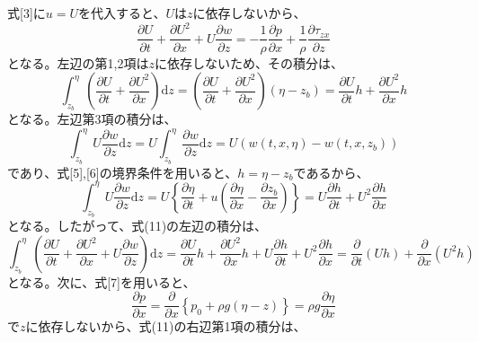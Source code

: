 \documentclass[a4paper]{jsarticle}
\begin{document}
\subsection{}
式[3]に$u = U$を代入すると、$U$は$z$に依存しないから、
\begin{equation}
  \frac{\partial U}{\partial t} + \frac{\partial U^2}{\partial x}
  + U \frac{\partial w}{\partial z} = -\frac{1}{\rho} \frac{\partial p}{\partial x}
  + \frac{1}{\rho} \frac{\partial \tau_{zx}}{\partial z}
\end{equation}
となる。左辺の第1,2項は$z$に依存しないため、その積分は、
\begin{equation}
  \int_{z_b}^{\eta} \left(\frac{\partial U}{\partial t} + \frac{\partial U^2}{\partial x}\right) \mathrm{d} z
  = \left(\frac{\partial U}{\partial t} + \frac{\partial U^2}{\partial x}\right) (\eta - z_b)
  = \frac{\partial U}{\partial t} h + \frac{\partial U^2}{\partial x} h
\end{equation}
となる。左辺第3項の積分は、
\begin{equation}
  \int_{z_b}^{\eta} U \frac{\partial w}{\partial z} \mathrm{d} z
  = U \int_{z_b}^{\eta} \frac{\partial w}{\partial z} \mathrm{d} z
  = U \left(w(t, x, \eta) - w(t, x, z_b)\right)
\end{equation}
であり、式[5],[6]の境界条件を用いると、$h = \eta - z_b$であるから、
\begin{equation}
  \int_{z_b}^{\eta} U \frac{\partial w}{\partial z} \mathrm{d} z
  = U \left\{\frac{\partial \eta}{\partial t} + u \left(\frac{\partial \eta}{\partial x}
  - \frac{\partial z_b}{\partial x}\right)\right\}
  = U \frac{\partial h}{\partial t} + U^2 \frac{\partial h}{\partial x}
\end{equation}
となる。したがって、式(11)の左辺の積分は、
\begin{equation}
  \int_{z_b}^{\eta} \left(\frac{\partial U}{\partial t} + \frac{\partial U^2}{\partial x}
  + U \frac{\partial w}{\partial z}\right) \mathrm{d} z
  = \frac{\partial U}{\partial t} h + \frac{\partial U^2}{\partial x} h
  + U \frac{\partial h}{\partial t} + U^2 \frac{\partial h}{\partial x}
  = \frac{\partial}{\partial t} (U h) + \frac{\partial}{\partial x} (U^2 h)
\end{equation}
となる。次に、式[7]を用いると、
\begin{equation}
  \frac{\partial p}{\partial x}
  = \frac{\partial}{\partial x} \left\{p_0 + \rho g (\eta - z)\right\}
  = \rho g \frac{\partial \eta}{\partial x}
\end{equation}
で$z$に依存しないから、式(11)の右辺第1項の積分は、
\end{document}
